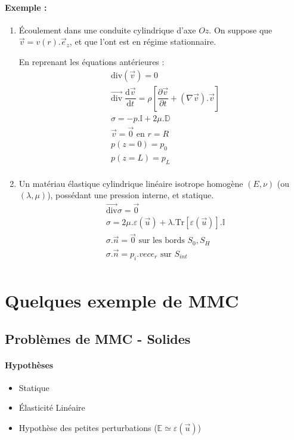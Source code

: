 \documentclass{article}
\newcommand{\deriv}{\mathrm{d}}
\begin{document}
\paragraph{Exemple :}
\begin{enumerate}
\item Écoulement dans une conduite cylindrique d'axe $Oz$. On suppose que $\vec{v}=v(r).\vec{e}_z$, et que l'ont est en régime stationnaire.

En reprenant les équations antérieures : 
\begin{align*}
& \text{div}(\vec{v}) = 0\\
& \overrightarrow{\text{div}}\;\dfrac{\deriv \vec{v}}{\deriv t}=\rho \left[\dfrac{\partial \vec{v}}{\partial t} + (\nabla \vec{v}).\vec{v}\right]\\
& \sigma = -p.\mathbb{I} + 2\mu.\mathbb{D}\\
& \vec{v}=\vec{0} \text{ en } r=R\\
& p(z=0)=p_0\\
& p(z=L)=p_L\\
\end{align*}

\item Un matériau élastique cylindrique linéaire isotrope homogène $(E,\nu)$ (ou $(\lambda, \mu)$), possédant une pression interne, et statique.
\begin{align*}
& \overrightarrow{\text{div}}\sigma = \vec{0}\\
& \sigma = 2\mu.\varepsilon(\vec{u}) + \lambda.\text{Tr} [\varepsilon(\vec{u})].\mathbb{I}\\
& \sigma.\vec{n}=\vec{0} \text{ sur les bords } S_0,S_H\\
& \sigma.\vec{n}=p_i.vec{e}_r \text{ sur } S_{int}\\
\end{align*}
\end{enumerate}

\section{Quelques exemple de MMC}
\subsection{Problèmes de MMC - Solides}
\paragraph{Hypothèses}
\begin{itemize}
\item Statique
\item Élasticité Linéaire
\item Hypothèse des petites perturbations ($\mathbb{E}\simeq \varepsilon (\vec{u})$)
\end{itemize}
\end{document}
